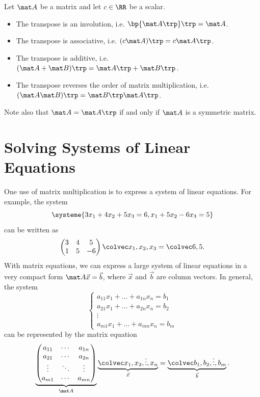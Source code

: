 \begin{fact}
    Let $\mat A$ be a matrix and let $c \in \RR$ be a scalar.
    \begin{itemize}
        \item The transpose is an involution, i.e. $\bp{\mat A \trp} \trp = \mat A$.
        \item The transpose is associative, i.e. $(c\mat A) \trp = c \mat A \trp$.
        \item The transpose is additive, i.e. $(\mat A + \mat B)\trp = \mat A \trp + \mat B \trp$.
        \item The transpose reverses the order of matrix multiplication, i.e. $(\mat A \mat B) \trp = \mat B \trp \mat A \trp$.
    \end{itemize}
\end{fact}

Note also that $\mat A = \mat A \trp$ if and only if $\mat A$ is a symmetric matrix.

\section{Solving Systems of Linear Equations}

One use of matrix multiplication is to express a system of linear equations. For example, the system \[\systeme{3x_1 + 4x_2 + 5x_3 = 6, x_1 + 5x_2 - 6x_3 = 5}\] can be written as \[\begin{pmatrix}3 & 4 & 5 \\ 1 & 5 & -6\end{pmatrix} \cveciii{x_1}{x_2}{x_3} = \cvecii65.\] With matrix equations, we can express a large system of linear equations in a very compact form $\mat A \vec x = \vec b$, where $\vec x$ and $\vec b$ are column vectors. In general, the system \[\left\{ \begin{matrix}a_{11} x_1 + \dots + a_{1n} x_n = b_1 \\ a_{21} x_1 + \dots + a_{2n} x_n = b_2 \\ \vdots \\ a_{m1} x_1 + \dots + a_{mn} x_n = b_m \end{matrix}\right.\] can be represented by the matrix equation \[\underbrace{\begin{pmatrix}a_{11} & \cdots & a_{1n} \\ a_{21} & \cdots & a_{2n} \\ \vdots & \ddots & \vdots \\ a_{m1} & \cdots & a_{mn} \end{pmatrix}}_{\mat A} \underbrace{\cveciv{x_1}{x_2}{\vdots}{x_n}}_{\vec x} = \underbrace{\cveciv{b_1}{b_2}{\vdots}{b_m}}_{\vec b}.\]

